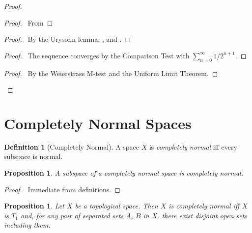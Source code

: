 \documentclass{report}
\let\qed\relax
\newtheorem{prop}[lm]{Proposition}
\theoremstyle{definition}
\newtheorem{df}[lm]{Definition}
\begin{document}
 \begin{proof}
   \pf
   \begin{proof}
     \pf\ From 
   \end{proof}
   \begin{proof}
     \pf\ By the Urysohn lemma,
     ,  and .
   \end{proof}
   \begin{proof}
     \pf\ The sequence converges by the Comparison Test with $\sum_{n=0}^\infty 1/2^{n+1}$.
   \end{proof}
   \begin{proof}
     \pf\ By the Weierstrass M-test and the Uniform Limit Theorem.
   \end{proof}
   \qed
 \end{proof}

  \section{Completely Normal Spaces}

    \begin{df}[Completely Normal]
    A space $X$ is \emph{completely normal} iff every subspace is normal.
  \end{df}

      \begin{prop}
   A subspace of a completely normal space is completely normal.
  \end{prop}

  \begin{proof}
   \pf\ Immediate from definitions. \qed
  \end{proof}

    \begin{prop}
    \label{prop:topology:completely_normal:characterisation}
   Let $X$ be a topological space. Then $X$ is completely normal iff $X$ is
$T_1$ and, for any pair of separated sets $A$, $B$ in $X$, there exist disjoint
open sets including them.
  \end{prop}
\end{document}
